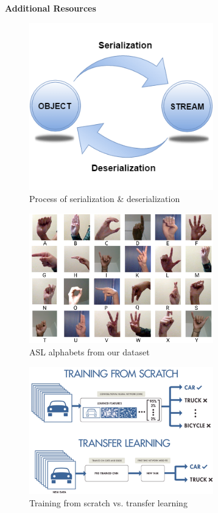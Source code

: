 \documentclass[twocolumn]{article}
\begin{document}



\listoffigures
\listoftables

\glsaddall
\setlength{\glsdescwidth}{0.8\textwidth}
\printglossary[type=\acronymtype,title=List Of Abbreviations]

\clearpage
\LARGE{\textbf{Additional Resources}}

\begin{figure}[h]
\centering
\includegraphics[width=8cm]{./figures/serialization and deserialization}
\caption{Process of serialization \& deserialization}
\end{figure}

\begin{figure}[h]
\centering
\includegraphics[width=8cm]{./figures/alphabets}
\caption{ASL alphabets from our dataset}
\end{figure}

\begin{figure}[h]
\centering
\includegraphics[width=8cm]{./figures/training from scratch vs. transfer learning}
\caption{Training from scratch vs. transfer learning}
\end{figure}
\end{document}
